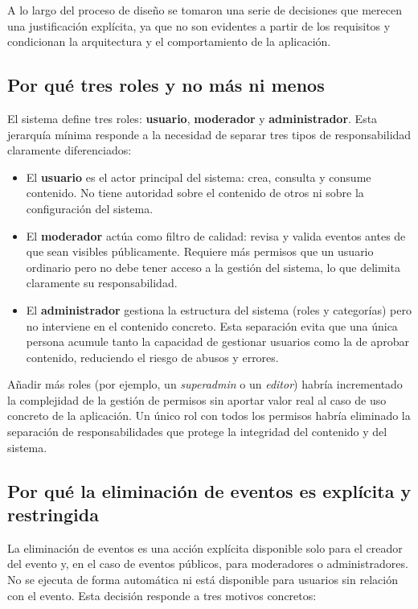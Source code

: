 A lo largo del proceso de diseño se tomaron una serie de decisiones que merecen una justificación explícita, ya que no son evidentes a partir de los requisitos y condicionan la arquitectura y el comportamiento de la aplicación.

\subsection{Por qué tres roles y no más ni menos}

El sistema define tres roles: \textbf{usuario}, \textbf{moderador} y \textbf{administrador}. Esta jerarquía mínima responde a la necesidad de separar tres tipos de responsabilidad claramente diferenciados:

\begin{itemize}
    \item El \textbf{usuario} es el actor principal del sistema: crea, consulta y consume contenido. No tiene autoridad sobre el contenido de otros ni sobre la configuración del sistema.
    \item El \textbf{moderador} actúa como filtro de calidad: revisa y valida eventos antes de que sean visibles públicamente. Requiere más permisos que un usuario ordinario pero no debe tener acceso a la gestión del sistema, lo que delimita claramente su responsabilidad.
    \item El \textbf{administrador} gestiona la estructura del sistema (roles y categorías) pero no interviene en el contenido concreto. Esta separación evita que una única persona acumule tanto la capacidad de gestionar usuarios como la de aprobar contenido, reduciendo el riesgo de abusos y errores.
\end{itemize}

Añadir más roles (por ejemplo, un \textit{superadmin} o un \textit{editor}) habría incrementado la complejidad de la gestión de permisos sin aportar valor real al caso de uso concreto de la aplicación. Un único rol con todos los permisos habría eliminado la separación de responsabilidades que protege la integridad del contenido y del sistema.

\subsection{Por qué la eliminación de eventos es explícita y restringida}

La eliminación de eventos es una acción explícita disponible solo para el creador del evento y, en el caso de eventos públicos, para moderadores o administradores. No se ejecuta de forma automática ni está disponible para usuarios sin relación con el evento. Esta decisión responde a tres motivos concretos:


